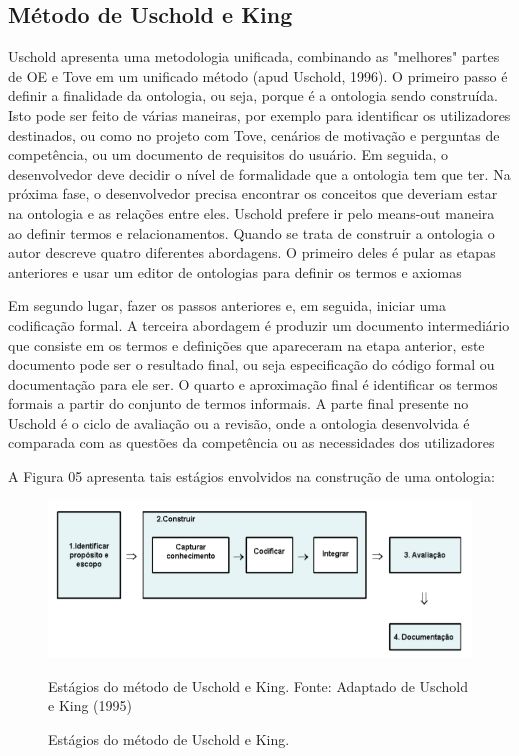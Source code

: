 \documentclass[a4paper]{report}
\begin{document}
\subsection{Método de Uschold e King} 
\qquad Uschold apresenta uma metodologia unificada, combinando as "melhores" partes de OE e Tove em um unificado método (apud Uschold, 1996). O primeiro passo é definir a finalidade da ontologia, ou seja, porque é a ontologia sendo construída. Isto pode ser feito de várias maneiras, por exemplo para identificar os utilizadores destinados, ou como no projeto com Tove, cenários de motivação e perguntas de competência, ou um documento de requisitos do usuário. Em seguida, o desenvolvedor deve decidir o nível de formalidade que a ontologia tem que ter. Na próxima fase, o desenvolvedor precisa encontrar os conceitos que deveriam estar na ontologia e as relações entre eles. Uschold prefere ir pelo means-out maneira ao definir termos e relacionamentos. Quando se trata de construir a ontologia o autor descreve quatro diferentes abordagens. O primeiro deles é pular as etapas anteriores e usar um editor de ontologias para definir os termos e axiomas %

Em segundo lugar, fazer os passos anteriores e, em seguida, iniciar uma codificação formal. A terceira abordagem é produzir um documento intermediário que consiste em os termos e definições que apareceram na etapa anterior, este documento pode ser o resultado final, ou seja especificação do código formal ou documentação para ele ser. O quarto e aproximação final é identificar os termos formais a partir do conjunto de termos informais. A parte final presente no Uschold é o ciclo de avaliação ou a revisão, onde a ontologia desenvolvida é comparada com as questões da competência ou as necessidades dos utilizadores %

A Figura 05 apresenta tais estágios envolvidos na construção de uma ontologia:

\begin{figure}[h] 
\centering %
\includegraphics[scale=0.5]{Figuras/5.png} %
\caption{Estágios do método de Uschold e King.
Fonte: Adaptado de Uschold e King (1995)}
\caption[Estágios do método de Uschold e King]{Estágios do método de Uschold e King. %
}
\end{figure}
\end{document}
